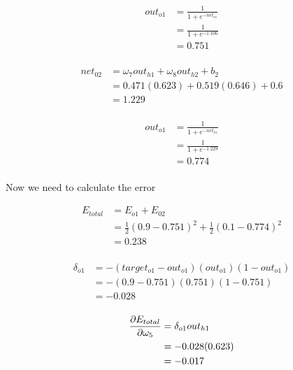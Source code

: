 \documentclass[10pt,a4paper]{article}
\begin{document}
\begin{equation}
\begin{split}
out_{o1} &= \frac{1}{1+e^{-net_{o1}}}\\ 
         &= \frac{1}{1+e^{-1.106}}\\ 
         &= 0.751\\
\end{split}
\end{equation}

\begin{equation}
\begin{split}
net_{02} &= \omega_7 out_{h1} + \omega_8 out_{h2} + b_2 \\
         &= 0.471(0.623) + 0.519(0.646) + 0.6 \\
         &= 1.229\\
\end{split}
\end{equation}

\begin{equation}
\begin{split}
out_{o1} &= \frac{1}{1+e^{-net_{h1}}}\\ 
         &= \frac{1}{1+e^{-1.229}}\\ 
         &= 0.774\\
\end{split}
\end{equation}

Now we need to calculate the error

\begin{equation}
\begin{split}
E_{total} &= E_{o1} + E_{02} \\
          &= \frac{1}{2}(0.9-0.751)^2 + \frac{1}{2}(0.1 - 0.774)^2 \\
          &= 0.238 \\
\end{split}
\end{equation}

\begin{equation}
\begin{split}
\delta_{o1} &= -(target_{o1} -out_{o1})(out_{o1})(1-out_{o1})\\
            &= -(0.9-0.751)(0.751)(1-0.751)\\
            &= -0.028\\
\end{split}
\end{equation}

\begin{equation}
\begin{split}
\pdv{E_{total}}{\omega_5} &= \delta_{o1}out_{h1}\\
                          &= -0.028(0.623)\\
                          &= -0.017\\
\end{split}
\end{equation}
\end{document}
